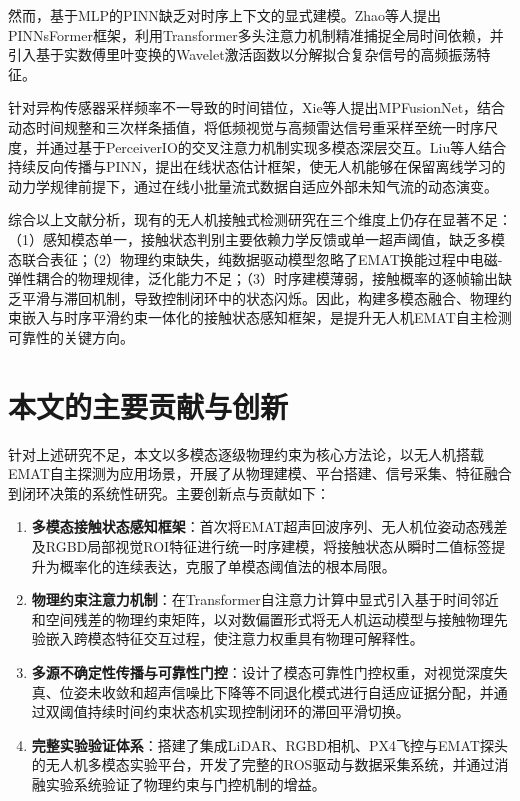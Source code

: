 然而，基于MLP的PINN缺乏对时序上下文的显式建模。Zhao等人提出PINNsFormer框架，利用Transformer多头注意力机制精准捕捉全局时间依赖，并引入基于实数傅里叶变换的Wavelet激活函数以分解拟合复杂信号的高频振荡特征。

针对异构传感器采样频率不一导致的时间错位，Xie等人提出MPFusionNet，结合动态时间规整和三次样条插值，将低频视觉与高频雷达信号重采样至统一时序尺度，并通过基于PerceiverIO的交叉注意力机制实现多模态深层交互。Liu等人结合持续反向传播与PINN，提出在线状态估计框架，使无人机能够在保留离线学习的动力学规律前提下，通过在线小批量流式数据自适应外部未知气流的动态演变。

综合以上文献分析，现有的无人机接触式检测研究在三个维度上仍存在显著不足：（1）感知模态单一，接触状态判别主要依赖力学反馈或单一超声阈值，缺乏多模态联合表征；（2）物理约束缺失，纯数据驱动模型忽略了EMAT换能过程中电磁-弹性耦合的物理规律，泛化能力不足；（3）时序建模薄弱，接触概率的逐帧输出缺乏平滑与滞回机制，导致控制闭环中的状态闪烁。因此，构建多模态融合、物理约束嵌入与时序平滑约束一体化的接触状态感知框架，是提升无人机EMAT自主检测可靠性的关键方向。

\section{本文的主要贡献与创新}

针对上述研究不足，本文以多模态逐级物理约束为核心方法论，以无人机搭载EMAT自主探测为应用场景，开展了从物理建模、平台搭建、信号采集、特征融合到闭环决策的系统性研究。主要创新点与贡献如下：

\begin{enumerate}
\item \textbf{多模态接触状态感知框架}：首次将EMAT超声回波序列、无人机位姿动态残差及RGBD局部视觉ROI特征进行统一时序建模，将接触状态从瞬时二值标签提升为概率化的连续表达，克服了单模态阈值法的根本局限。
\item \textbf{物理约束注意力机制}：在Transformer自注意力计算中显式引入基于时间邻近和空间残差的物理约束矩阵，以对数偏置形式将无人机运动模型与接触物理先验嵌入跨模态特征交互过程，使注意力权重具有物理可解释性。
\item \textbf{多源不确定性传播与可靠性门控}：设计了模态可靠性门控权重，对视觉深度失真、位姿未收敛和超声信噪比下降等不同退化模式进行自适应证据分配，并通过双阈值持续时间约束状态机实现控制闭环的滞回平滑切换。
\item \textbf{完整实验验证体系}：搭建了集成LiDAR、RGBD相机、PX4飞控与EMAT探头的无人机多模态实验平台，开发了完整的ROS驱动与数据采集系统，并通过消融实验系统验证了物理约束与门控机制的增益。
\end{enumerate}

